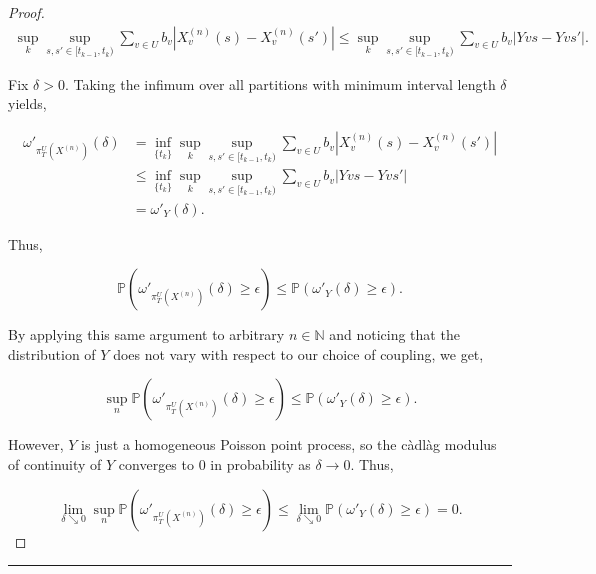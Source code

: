 \documentclass[12pt]{article}
\newcommand{\mb}{\mathbb}
\newcommand{\ra}{\rightarrow}
\newcommand{\ep}{\epsilon}
\newcommand{\lin}{\rule{\linewidth}{0.4 pt}}
\newcommand{\pr}{\mb{P}}							%
\renewcommand{\v}{v}							%
\renewcommand{\U}{U}							%
\renewcommand{\b}{b}							%
\newcommand{\T}{T}								%
\renewcommand{\t}{t}							%
\newcommand{\proj}{\pi}							%
\renewcommand{\tt}{s}							%
\newcommand{\ttt}{s'}							%
\newcommand{\X}{X}								%
\newcommand{\vsi}[1]{^{#1}}						%
\newcommand{\cind}[1]{_{#1}}					%
\newcommand{\tp}[1]{(#1)}						%
\newcommand{\tip}[1]{#1}						%
\newcommand{\ts}[1]{_{#1}}						%
\newcommand{\sln}[1]{^{(#1)}}					%
\newcommand{\indx}[1]{_{#1}}					%
\newcommand{\XX}{Y}								%
\renewcommand{\it}{k}							%
\begin{document}
\begin{proof}
\begin{align*}
\sup_\it\sup_{\tt,\ttt \in [\t\indx{\it-1},\t\indx{\it})} \sum_{\v\in \U} \b\cind{\v}|\X\sln{n}\cind{\v}\tp{\tt} - \X\sln{n}\cind{\v}\tp{\ttt}|\leq \sup_\it\sup_{\tt,\ttt \in [\t\indx{\it-1},\t\indx{\it})} \sum_{\v\in \U} \b\cind{\v}|\XX{\v}{\tt} - \XX{\v}{\ttt}|.
\end{align*}

Fix \(\delta > 0\). Taking the infimum over all partitions with minimum interval length \(\delta\) yields,

\begin{align*}
\omega'_{\proj\vsi{\U}\ts{\T}\left(\X\sln{n}\cind{}\tip{}\right)}(\delta) &= \inf_{\{\t\indx{\it}\}}\sup_\it\sup_{\tt,\ttt \in [\t\indx{\it-1},\t\indx{\it})} \sum_{\v\in \U} \b\cind{\v}|\X\sln{n}\cind{\v}\tp{\tt} - \X\sln{n}\cind{\v}\tp{\ttt}|\\
&\leq \inf_{\{\t\indx{\it}\}}\sup_\it\sup_{\tt,\ttt \in [\t\indx{\it-1},\t\indx{\it})} \sum_{\v\in \U} \b\cind{\v}|\XX{\v}{\tt} - \XX{\v}{\ttt}|\\
&= \omega'_{\XX{}{}}(\delta).
\end{align*}

Thus,

\[\pr\left(\omega'_{\proj\vsi{\U}\ts{\T}\left(\X\sln{n}\cind{}\tip{}\right)}(\delta) \geq \ep\right) \leq \pr\left(\omega'_{\XX{}{}}(\delta) \geq \ep\right).\]

By applying this same argument to arbitrary \(n\in \mb{N}\) and noticing that the distribution of \(\XX{}{}\) does not vary with respect to our choice of coupling, we get,

\[\sup_{n}\pr\left(\omega'_{\proj\vsi{\U}\ts{\T}\left(\X\sln{n}\cind{}\tip{}\right)}(\delta)\geq \ep\right) \leq \pr\left(\omega'_{\XX{}{}}(\delta) \geq \ep\right).\]

However, \(\XX{}{}\) is just a homogeneous Poisson point process, so the c\`adl\`ag modulus of continuity of \(\XX{}{}\) converges to 0 in probability as \(\delta \ra 0\). Thus,

\[\lim_{\delta \searrow 0}\sup_{n}\pr\left(\omega'_{\proj\vsi{\U}\ts{\T}\left(\X\sln{n}\cind{}\tip{}\right)}(\delta) \geq \ep\right) \leq \lim_{\delta\searrow 0}\pr\left(\omega'_{\XX{}{}}(\delta)\geq \ep\right) = 0.\]


\end{proof}

\lin
\end{document}
